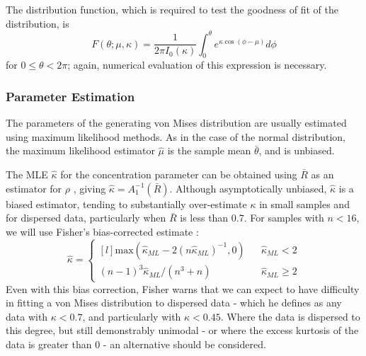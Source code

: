 \documentclass[../../ArchStats.tex]{subfiles}
\begin{document}
The distribution function, which is required to test the goodness of fit of the distribution, is
	\begin{equation}
	F(\theta; \mu, \kappa) = \frac{1}{2\pi I_0(\kappa)} \int_0^\theta e^{\kappa \cos(\phi - \mu)}d\phi
	\end{equation}
for $0 \leq \theta < 2\pi$; again, numerical evaluation of this expression is necessary.
 


\subsubsection{Parameter Estimation}

The parameters of the generating von Mises distribution are usually estimated using maximum likelihood methods. As in the case of the normal distribution, the maximum likelihood estimator $\hat{\mu}$ is the sample mean $\bar{\theta}$, and is unbiased.

The MLE $\hat{\kappa}$ for the concentration parameter can be obtained using $\bar{R}$ as an estimator for $\rho$ , giving $\hat{\kappa} = A_1^{-1}(\bar{R})$. Although asymptotically unbiased, $\hat{\kappa}$ is a biased estimator, tending to substantially over-estimate $\kappa$ in small samples and for dispersed data, particularly when $\bar{R}$ is less than 0.7. For samples with $n < 16$, we will use Fisher's bias-corrected estimate \cite{Fisher1993}:
	\begin{equation}
	\hat{\kappa} = \left\lbrace \begin{matrix*}[l]
	\text{max} ( \hat{\kappa}_{ML} - 2(n \hat{\kappa}_{ML})^{-1}, 0) & & \hat{\kappa}_{ML} < 2 \\
	(n-1)^3 \hat{\kappa}_{ML} / (n^3 + n) & &  \hat{\kappa}_{ML} \geq 2
	\end{matrix*} \right. 
	\end{equation}
Even with this bias correction, Fisher warns that we can expect to have difficulty in fitting a von Mises distribution to dispersed data -  which he defines as any data with $\kappa < 0.7$, and particularly with $\kappa < 0.45$. Where the data is dispersed to this degree, but still demonstrably unimodal - or where the excess kurtosis of the data is greater than 0 - an alternative should be considered.
\end{document}
